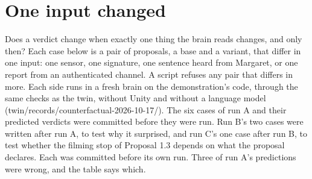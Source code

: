 \section{One input changed}\label{sec:cf}
Does a verdict change when exactly one thing the brain reads changes, and only then? Each case below is a pair of proposals, a base and a variant, that differ in one input: one sensor, one signature, one sentence heard from Margaret, or one report from an authenticated channel. A script refuses any pair that differs in more. Each side runs in a fresh brain on the demonstration's code, through the same checks as the twin, without Unity and without a language model (twin/records/counterfactual-2026-10-17/). The six cases of run A and their predicted verdicts were committed before they were run. Run B's two cases were written after run A, to test why it surprised, and run C's one case after run B, to test whether the filming stop of Proposal 1.3 depends on what the proposal declares. Each was committed before its own run. Three of run A's predictions were wrong, and the table says which.\par\medskip

